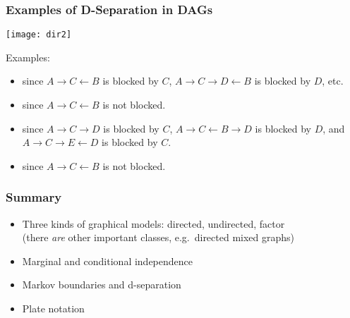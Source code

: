 \begin{frame}
\frametitle{Examples of D-Separation in DAGs}

\vspace*{-3ex} 
\hspace*{3in} \texttt{[image: dir2]}

Examples:

\begin{itemize}
\item {} since $A \rightarrow C \leftarrow B$ is
  blocked by $C$, $A
  \rightarrow C \rightarrow D \leftarrow B$ is blocked by $D$, etc.
\item {} since $A \rightarrow C \leftarrow B$ is not
blocked.
\item {} since $A \rightarrow C
  \rightarrow D$ is 
  blocked by $C$,  $A \rightarrow C \leftarrow B \rightarrow D$ is
  blocked by $D$, and $A \rightarrow C \rightarrow E \leftarrow D$ is
  blocked by $C$.
\item {} since $A \rightarrow C \leftarrow B$
  is not blocked.
\end{itemize}


\end{frame}
\begin{frame}
\frametitle{Summary}

\begin{itemize}
\item Three kinds of graphical models: directed, undirected, factor \\
  (there {\em are} other important classes, e.g.\ directed mixed graphs)
\item Marginal and conditional independence
\item Markov boundaries and d-separation
\item Plate notation
\end{itemize}


\end{frame}
